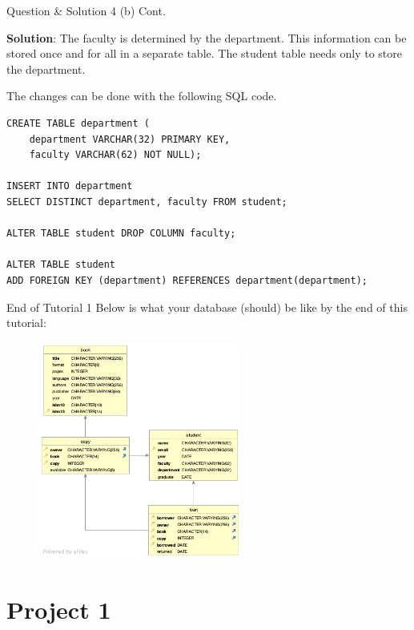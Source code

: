 \begin{frame}[fragile]{Question \& Solution 4 (b) Cont.}

\textbf{Solution}:
The faculty is determined by the department. This information can be stored once and for all in a separate table. The student table needs only to store the department. \vspace{10pt}

The changes can be done with the following SQL code.

\begin{lstlisting}
CREATE TABLE department (
	department VARCHAR(32) PRIMARY KEY,
	faculty VARCHAR(62) NOT NULL);

INSERT INTO department 
SELECT DISTINCT department, faculty FROM student;

ALTER TABLE student DROP COLUMN faculty;

ALTER TABLE student
ADD FOREIGN KEY (department) REFERENCES department(department);
\end{lstlisting}
\end{frame}


\begin{frame}[fragile]{End of Tutorial 1}
	Below is what your database (should) be like by the end of this tutorial:
	
	\begin{figure}
		\includegraphics[width=0.6\textwidth]{t1/images/t1-0.png}
	\end{figure}
\end{frame}

\section*{Project 1}

